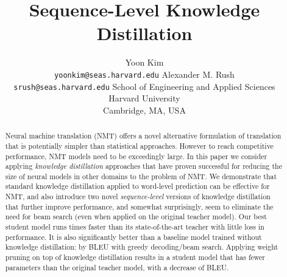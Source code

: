 \documentclass[11pt,letterpaper]{article}
\title{Sequence-Level Knowledge Distillation}
\author{Yoon Kim \\ {\tt yoonkim@seas.harvard.edu} 
\And 
Alexander M. Rush \\ {\tt srush@seas.harvard.edu} 
\AND 
\textnormal{School of Engineering and Applied Sciences} \\
\textnormal{Harvard University} \\
Cambridge, MA, USA  \\
}
\date{}
\begin{document}
\maketitle



\newcommand{\fix}{\marginpar{FIX}}
\newcommand{\new}{\marginpar{NEW}}
\newcommand{\xvec}{\mathbf{x}}
\newcommand{\yvec}{\mathbf{y}}
\newcommand{\cvec}{\mathbf{c}}
\newcommand{\zvec}{\mathbf{z}}
\newcommand{\svec}{\mathbf{s}}
\newcommand{\tvec}{\mathbf{t}}
\newcommand{\mcL}{\mathcal{L}}
\newcommand{\mcT}{\mathcal{T}}
\newcommand{\mcY}{\mathcal{Y}}
\newcommand{\mcV}{\mathcal{V}}
\newcommand{\mcC}{\mathcal{C}}
\newcommand{\mcA}{\mathcal{A}}
\newcommand{\context}{\mathbf{y}_{\mathrm{c}}}
\newcommand{\embcontext}{\mathbf{\tilde{y}}_{\mathrm{c}}}
\newcommand{\inpcontext}{\mathbf{\tilde{x}}}
\newcommand{\start}{\mathbf{\tilde{y}}_{\mathrm{c0}}}
\newcommand{\End}{\mathrm{\texttt{</s>}}}

\newcommand{\Uvec}{\mathbf{U}}
\newcommand{\Evec}{\mathbf{E}}
\newcommand{\Gvec}{\mathbf{G}}
\newcommand{\Fvec}{\mathbf{F}}
\newcommand{\Pvec}{\mathbf{P}}
\newcommand{\pvec}{\mathbf{p}}
\newcommand{\Vvec}{\mathbf{V}}
\newcommand{\Wvec}{\mathbf{W}}
\newcommand{\hvec}{\mathbf{h}}
\newcommand{\wvec}{\mathbf{w}}
\newcommand{\uvec}{\mathbf{u}}
\newcommand{\vvec}{\mathbf{v}}
\newcommand{\bvec}{\mathbf{b}}
\newcommand{\reals}{\mathbb{R}}
\newcommand\given{\,|\,}


\maketitle

\begin{abstract} 
  Neural machine translation (NMT) offers a novel alternative
  formulation of translation that is potentially simpler than
  statistical approaches. However to reach competitive performance,
  NMT models need to be exceedingly large.
  In this paper we consider
  applying \textit{knowledge distillation} approaches 
  \cite{Bucila2006,Hinton2015} that have proven
  successful for reducing the size of neural models in other domains
  to the problem of NMT. We demonstrate that standard knowledge
  distillation applied to word-level prediction can be effective for
  NMT, and also introduce two novel \textit{sequence-level} versions
  of knowledge distillation that further improve performance, and
  somewhat surprisingly, seem to eliminate the need for beam search (even when
  applied on the original teacher model). Our best
  student model runs  times faster than its state-of-the-art teacher with
  little loss in performance. 
  It is also significantly better than a baseline model trained without
   knowledge distillation: by  BLEU with greedy decoding/beam search. 
   Applying weight pruning on top of knowledge distillation results in a student model
   that has  fewer parameters than the original teacher model,
   with a decrease of  BLEU.
\end{abstract}
\end{document}
